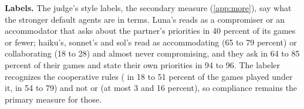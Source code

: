 \textbf{Labels.} The judge's style labels, the secondary measure (\cref{app:more}), say what the stronger default agents are in \tki{} terms. Luna's reads as a compromiser or an accommodator that asks about the partner's priorities in 40 percent of its games or fewer; haiku's, sonnet's and sol's read as accommodating (65 to 79 percent) or collaborating (18 to 28) and almost never compromising, and they ask in 64 to 85 percent of their games and state their own priorities in 94 to 96. The labeler recognizes the cooperative rules (\collaborating{} in 18 to 51 percent of the games played under it, \accommodating{} in 54 to 79) and not \competing{} or \avoiding{} (at most 3 and 16 percent), so compliance remains the primary measure for those.

